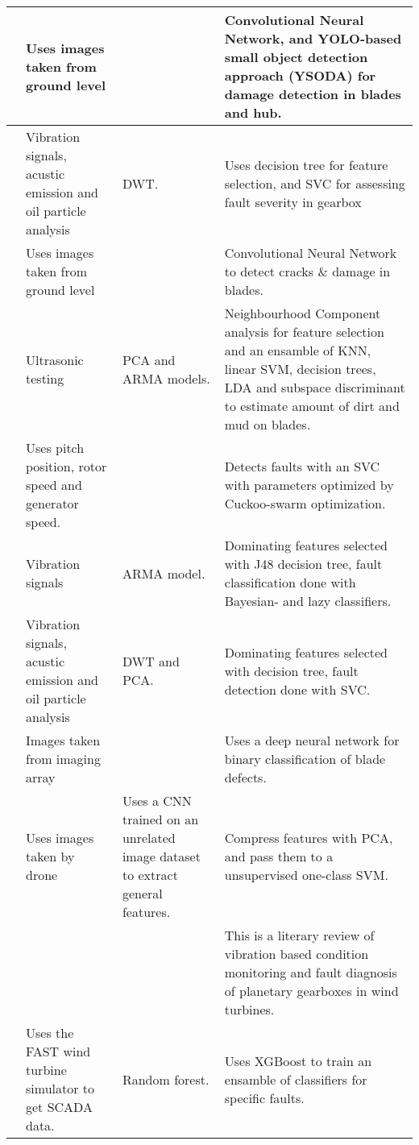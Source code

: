 \begin{longtable}{p{}p{}p{}p{}}
    \cite{image_based_YOLO_YSODA} & Uses images taken from ground level & & Convolutional Neural Network, and YOLO-based small object detection approach (YSODA) for damage detection in blades and hub.\\ \hline
    \cite{vibration_acustic_decision_tree_SVM_gearbox} & Vibration signals, acustic emission and oil particle analysis & DWT. & Uses decision tree for feature selection, and SVC for assessing fault severity in gearbox\\ \hline
    \cite{AI_image_analytics_2_classify_blade_defects} & Uses images taken from ground level & & Convolutional Neural Network to detect cracks $\&$ damage in blades.\\ \hline
    \cite{dirt_n_mud_detection_using_guided_waves} & Ultrasonic testing & PCA and ARMA models. & Neighbourhood Component analysis for feature selection and an ensamble of KNN, linear SVM, decision trees, LDA and subspace discriminant to estimate amount of dirt and mud on blades. \\ \hline
    \cite{fault_classification_using_CSO_SVM} & Uses pitch position, rotor speed and generator speed. & & Detects faults with an SVC with parameters optimized by Cuckoo-swarm optimization. \\ \hline
    \cite{vibration_ARMA_decision_tree_cm_wt} & Vibration signals & ARMA model. & Dominating features selected with J48 decision tree, fault classification done with Bayesian- and lazy classifiers. \\ \hline
    \cite{integrated_cm_bearing_fault_wt_gearbox} & Vibration signals, acustic emission and oil particle analysis & DWT and PCA. & Dominating features selected with decision tree, fault detection done with SVC. \\ \hline
    \cite{blade_defect_detection_imaging_array} & Images taken from imaging array & & Uses a deep neural network for binary classification of blade defects. \\ \hline
    \cite{unsupervised_AD_blade_damage_deep_features_images} & Uses images taken by drone & Uses a CNN trained on an unrelated image dataset to extract general features. & Compress features with PCA, and pass them to a unsupervised one-class SVM. \\ \hline
    \cite{vibration_fault_diagnosis_wt_planetary_gearbox} & & & This is a literary review of vibration based condition monitoring and fault diagnosis of planetary gearboxes in wind turbines. \\ \hline
    \cite{RF_XGB_fault_detection} & Uses the FAST wind turbine simulator to get SCADA data. & Random forest. & Uses XGBoost to train an ensamble of classifiers for specific faults. \\ \hline

\end{longtable}
